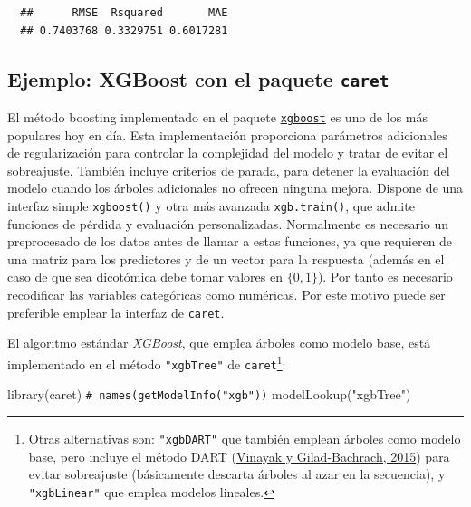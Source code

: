 \documentclass[
]{book}
\newenvironment{Shaded}{\begin{snugshade}}{\end{snugshade}}
\newcommand{\CommentTok}[1]{\textcolor[rgb]{0.56,0.35,0.01}{\textit{#1}}}
\newcommand{\FunctionTok}[1]{\textcolor[rgb]{0.00,0.00,0.00}{#1}}
\newcommand{\NormalTok}[1]{#1}
\newcommand{\StringTok}[1]{\textcolor[rgb]{0.31,0.60,0.02}{#1}}
\theoremstyle{break}
\theoremstyle{nonumberplain}
\renewcommand{\CommentTok}[1]{\textcolor[rgb]{0.41,0.41,0.41}{\texttt{#1}}}
\begin{document}
\begin{verbatim}
  ##      RMSE  Rsquared       MAE 
  ## 0.7403768 0.3329751 0.6017281
\end{verbatim}

\hypertarget{xgb-caret}{%
\subsection{\texorpdfstring{Ejemplo: XGBoost con el paquete \texttt{caret}}{Ejemplo: XGBoost con el paquete caret}}\label{xgb-caret}}

El método boosting implementado en el paquete \href{https://github.com/dmlc/xgboost/tree/master/R-package}{\texttt{xgboost}} es uno de los más populares hoy en día.
Esta implementación proporciona parámetros adicionales de regularización para controlar la complejidad del modelo y tratar de evitar el sobreajuste.
También incluye criterios de parada, para detener la evaluación del modelo cuando los árboles adicionales no ofrecen ninguna mejora.
Dispone de una interfaz simple \texttt{xgboost()} y otra más avanzada \texttt{xgb.train()}, que admite funciones de pérdida y evaluación personalizadas.
Normalmente es necesario un preprocesado de los datos antes de llamar a estas funciones, ya que requieren de una matriz para los predictores y de un vector para la respuesta (además en el caso de que sea dicotómica debe tomar valores en \(\{0, 1\}\)). Por tanto es necesario recodificar las variables categóricas como numéricas.
Por este motivo puede ser preferible emplear la interfaz de \texttt{caret}.

El algoritmo estándar \emph{XGBoost}, que emplea árboles como modelo base, está implementado en el método \texttt{"xgbTree"} de \texttt{caret}\footnote{Otras alternativas son: \texttt{"xgbDART"} que también emplean árboles como modelo base, pero incluye el método DART (\protect\hyperlink{ref-vinayak2015dart}{Vinayak y Gilad-Bachrach, 2015}) para evitar sobreajuste (básicamente descarta árboles al azar en la secuencia), y \texttt{"xgbLinear"} que emplea modelos lineales.}:

\begin{Shaded}
\begin{Highlighting}[]
\FunctionTok{library}\NormalTok{(caret)}
\CommentTok{\# names(getModelInfo("xgb"))}
\FunctionTok{modelLookup}\NormalTok{(}\StringTok{"xgbTree"}\NormalTok{)}
\end{Highlighting}
\end{Shaded}
\end{document}
